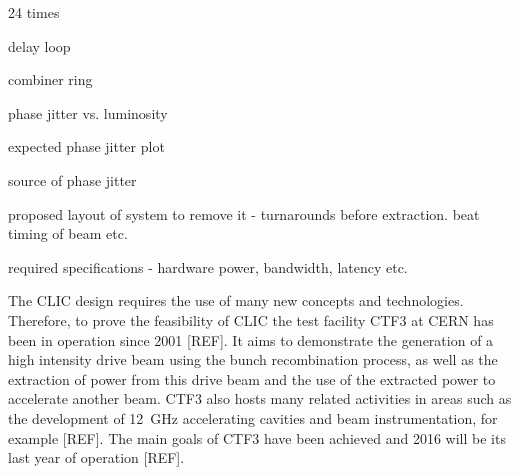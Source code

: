 24 times

delay loop

combiner ring



phase jitter vs. luminosity

expected phase jitter plot

source of phase jitter

proposed layout of system to remove it - turnarounds before extraction. beat timing of beam etc.

required specifications - hardware power, bandwidth, latency etc.


The CLIC design requires the use of many new concepts and technologies. Therefore, to prove the feasibility of CLIC the test facility CTF3 at CERN has been in operation since 2001 [REF]. It aims to demonstrate the generation of a high intensity drive beam using the bunch recombination process, as well as the extraction of power from this drive beam and the use of the extracted power to accelerate another beam. CTF3 also hosts many related activities in areas such as the development of 12~GHz accelerating cavities and beam instrumentation, for example [REF]. The main goals of CTF3 have been achieved and 2016 will be its last year of operation [REF].

